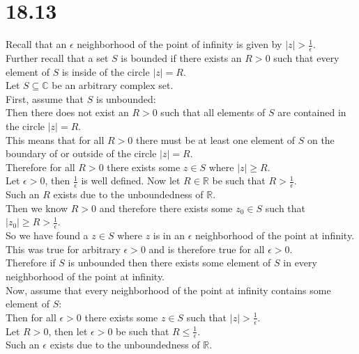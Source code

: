 \documentclass{article}
\begin{document}
\newpage
\section*{18.13}
\begin{center}
    \doublespacing
    Recall that an $\epsilon$ neighborhood of the point of infinity is given by $|z| >\frac{1}{\epsilon}$.
    \\Further recall that a set $S$ is bounded if there exists an $R > 0$ such that every element of $S$ is inside of the circle $|z| = R$.
    \\Let $S\subseteq\mathbb{C}$ be an arbitrary complex set.
    \break
    \\First, assume that $S$ is unbounded:
    \break
    \\Then there does not exist an $R > 0$ such that all elements of $S$ are contained in the circle $|z| = R$.
    \\This means that for all $R > 0$ there must be at least one element of $S$ on the boundary of or outside of the circle $|z| = R$.
    \\Therefore for all $R > 0$ there exists some $z\in S$ where $|z|\geq R$.
    \\Let $\epsilon > 0$, then $\frac{1}{\epsilon}$ is well defined. Now let $R\in\mathbb{R}$ be such that $R >\frac{1}{\epsilon}$.
    \\Such an $R$ exists due to the unboundedness of $\mathbb{R}$.
    \\Then we know $R > 0$ and therefore there exists some $z_0\in S$ such that $|z_0|\geq R >\frac{1}{\epsilon}$.
    \\So we have found a $z\in S$ where $z$ is in an $\epsilon$ neighborhood of the point at infinity.
    \\This was true for arbitrary $\epsilon > 0$ and is therefore true for all $\epsilon > 0$.
    \\Therefore if $S$ is unbounded then there exists some element of $S$ in every neighborhood of the point at infinity.
    \break
    \\Now, assume that every neighborhood of the point at infinity contains some element of $S$:
    \break
    \\Then for all $\epsilon > 0$ there exists some $z\in S$ such that $|z| >\frac{1}{\epsilon}$.
    \\Let $R > 0$, then let $\epsilon > 0$ be such that $R\leq\frac{1}{\epsilon}$.
    \\Such an $\epsilon$ exists due to the unboundedness of $\mathbb{R}$.

\end{center}
\end{document}
